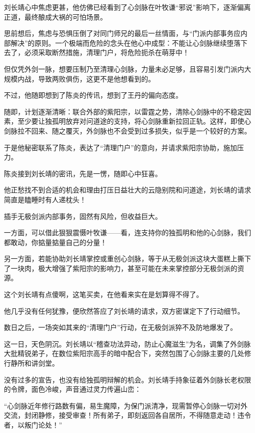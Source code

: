 刘长靖心中焦虑更甚，他仿佛已经看到了心剑脉在叶牧谦“邪说”影响下，逐渐偏离正道，最终酿成大祸的可怕场景。

思前想后，焦虑与恐惧压倒了对同门师兄的最后一丝情面，与“门派内部事务应内部解决”的原则。一个极端而危险的念头在他心中成型：不能让心剑脉继续堕落下去了，必须采取断然措施，清理门户，将危险扼杀在萌芽中！

但仅凭外剑一脉，想要压制乃至清理心剑脉，力量未必足够，且容易引发门派内大规模内战，导致两败俱伤，这更不是他想看到的。

不过，他随即想到了陈炎的传讯，想到了王丹的偏向态度。

随即，计划逐渐清晰：联合外部的紫阳宗，以雷霆之势，清除心剑脉中的不稳定因素，至少要让独孤明放弃对问道途的支持，将心剑脉重新拉回正轨。这样，即使心剑脉拉不回来、随之覆灭，外剑脉也不会受到过多损失，似乎是一个较好的方案。

于是他秘密联系了陈炎，表达了“清理门户”的意向，并请求紫阳宗协助，施加压力。

陈炎接到刘长靖的密讯，先是一愣，随即心中狂喜。

他正愁找不到合适的机会和理由打压日益壮大的云隐别院和问道途，刘长靖的请求简直是瞌睡时有人递枕头！

插手无极剑派内部事务，固然有风险，但收益巨大。

一方面，可以借此狠狠震慑叶牧谦——看，连支持你的独孤明和他的心剑脉，我们都敢动，你掂量掂量自己的分量！

另一方面，若能协助刘长靖掌控或重创心剑脉，等于从无极剑派这块大蛋糕上撕下了一块肉，极大增强了紫阳宗的影响力，甚至可能在未来掌控部分无极剑派的资源。

这个刘长靖有点傻啊，这笔买卖，在他看来实在是划算得不得了。

他几乎没有任何犹豫，便欣然答应了刘长靖的请求，双方密谋定下了行动细节。

\vspace{2em}

数日之后，一场突如其来的“清理门户”行动，在无极剑派猝不及防地爆发了。

这一日，天色阴沉。刘长靖以“稽查功法异动，防止心魔滋生”为名，调集了外剑脉大批精锐弟子，在数位紫阳宗高手的暗中配合下，突然包围了心剑脉主要的几处修行静所和讲剑堂。

没有过多的宣告，也没有给独孤明辩解的机会。刘长靖手持象征着外剑脉长老权限的令牌，面色冷峻，声音通过灵力传遍山峦：

“心剑脉近年修行路数有偏，易生魔障，为保门派清净，现需暂停心剑脉一切对外交流，封闭静修，接受审查！所有弟子，即刻返回各自居所，不得随意走动！违令者，以叛门论处！”


